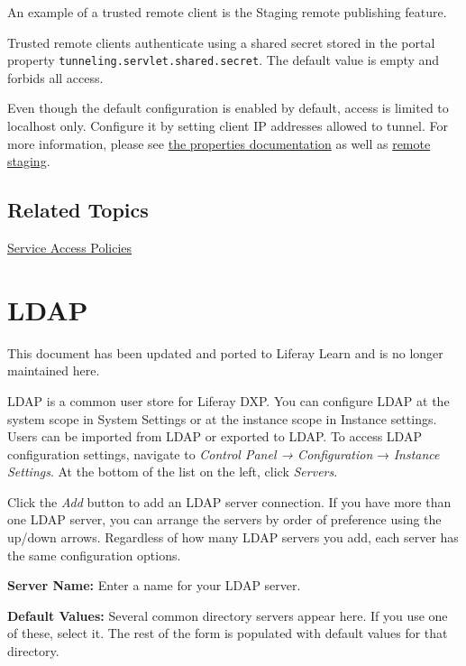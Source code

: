 An example of a trusted remote client is the Staging remote publishing
feature.

Trusted remote clients authenticate using a shared secret stored in the
portal property \texttt{tunneling.servlet.shared.secret}. The default
value is empty and forbids all access.

Even though the default configuration is enabled by default, access is
limited to localhost only. Configure it by setting client IP addresses
allowed to tunnel. For more information, please see
\href{https://docs.liferay.com/portal/7.2-latest/propertiesdoc/portal.properties.html\#HTTP\%20Tunneling}{the
properties documentation} as well as
\href{/docs/7-2/user/-/knowledge_base/u/enabling-remote-live-staging}{remote
staging}.

\section{Related Topics}\label{related-topics-4}

\href{/docs/7-2/deploy/-/knowledge_base/d/service-access-policies}{Service
Access Policies}

\chapter{LDAP}\label{ldap}

{This document has been updated and ported to Liferay Learn and is no
longer maintained here.}

LDAP is a common user store for Liferay DXP. You can configure LDAP at
the system scope in System Settings or at the instance scope in Instance
settings. Users can be imported from LDAP or exported to LDAP. To access
LDAP configuration settings, navigate to \emph{Control Panel →
Configuration} → \emph{Instance Settings}. At the bottom of the list on
the left, click \emph{Servers}.

Click the \emph{Add} button to add an LDAP server connection. If you
have more than one LDAP server, you can arrange the servers by order of
preference using the up/down arrows. Regardless of how many LDAP servers
you add, each server has the same configuration options.

\textbf{Server Name:} Enter a name for your LDAP server.

\textbf{Default Values:} Several common directory servers appear here.
If you use one of these, select it. The rest of the form is populated
with default values for that directory.

